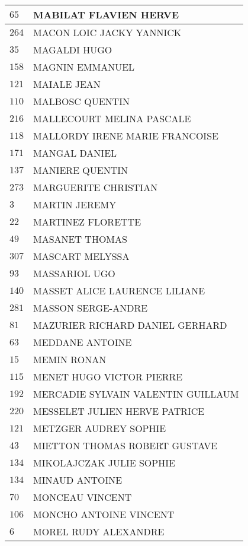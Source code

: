 \begin{xltabular}{\linewidth}{|l|X|}
    $65$ & MABILAT FLAVIEN HERVE \\
    \hline
    $264$ & MACON LOIC JACKY YANNICK \\
    \hline
    $35$ & MAGALDI HUGO \\
    \hline
    $158$ & MAGNIN EMMANUEL \\
    \hline
    $121$ & MAIALE JEAN \\
    \hline
    $110$ & MALBOSC QUENTIN \\
    \hline
    $216$ & MALLECOURT MELINA PASCALE \\
    \hline
    $118$ & MALLORDY IRENE MARIE FRANCOISE \\
    \hline
    $171$ & MANGAL DANIEL \\
    \hline
    $137$ & MANIERE QUENTIN \\
    \hline
    $273$ & MARGUERITE CHRISTIAN \\
    \hline
    $3$ & MARTIN JEREMY \\
    \hline
    $22$ & MARTINEZ FLORETTE \\
    \hline
    $49$ & MASANET THOMAS \\
    \hline
    $307$ & MASCART MELYSSA \\
    \hline
    $93$ & MASSARIOL UGO \\
    \hline
    $140$ & MASSET ALICE LAURENCE LILIANE \\
    \hline
    $281$ & MASSON SERGE-ANDRE \\
    \hline
    $81$ & MAZURIER RICHARD DANIEL GERHARD \\
    \hline
    $63$ & MEDDANE ANTOINE \\
    \hline
    $15$ & MEMIN RONAN \\
    \hline
    $115$ & MENET HUGO VICTOR PIERRE \\
    \hline
    $192$ & MERCADIE SYLVAIN VALENTIN GUILLAUM \\
    \hline
    $220$ & MESSELET JULIEN HERVE PATRICE \\
    \hline
    $121$ & METZGER AUDREY SOPHIE \\
    \hline
    $43$ & MIETTON THOMAS ROBERT GUSTAVE \\
    \hline
    $134$ & MIKOLAJCZAK JULIE SOPHIE \\
    \hline
    $134$ & MINAUD ANTOINE \\
    \hline
    $70$ & MONCEAU VINCENT \\
    \hline
    $106$ & MONCHO ANTOINE VINCENT \\
    \hline
    $6$ & MOREL RUDY ALEXANDRE \\

\end{xltabular}
